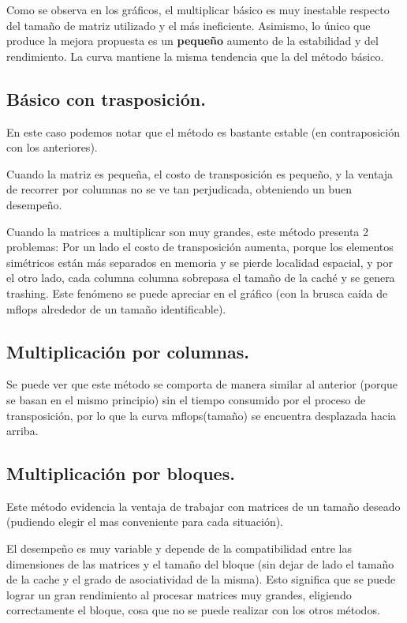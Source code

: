 \documentclass[a4paper,10pt]{article}
\begin{document}
Como se observa en los gráficos, el multiplicar básico es muy inestable respecto del tamaño de matriz utilizado y el más ineficiente. Asimismo, lo único que produce la mejora propuesta es un \textbf{pequeño} aumento de la estabilidad y del rendimiento. La curva mantiene la misma tendencia que la del método básico.

\subsection{Básico con trasposición.}

En este caso podemos notar que el método es bastante estable (en contraposición con los anteriores).

Cuando la matriz es pequeña, el costo de transposición es pequeño, y la ventaja de recorrer por columnas no se ve tan perjudicada, obteniendo un buen desempeño. 

Cuando la matrices a multiplicar son muy grandes, este método presenta 2 problemas: Por un lado el costo de transposición aumenta, porque los elementos simétricos están más separados en memoria y se pierde localidad espacial, y por el otro lado, cada columna columna sobrepasa el tamaño de la caché y se genera trashing. Este fenómeno se puede apreciar en el gráfico (con la brusca caída de mflops alrededor de un tamaño identificable).

\subsection{Multiplicación por columnas.}

Se puede ver que este método se comporta de manera similar al anterior (porque se basan en el mismo principio) sin el tiempo consumido por el proceso de transposición, por lo que la curva mflops(tamaño) se encuentra desplazada hacia arriba.

\subsection{Multiplicación por bloques.}

Este método evidencia la ventaja de trabajar con matrices de un tamaño deseado (pudiendo elegir el mas conveniente para cada situación).

El desempeño es muy variable y depende de la compatibilidad entre las dimensiones de las matrices y el tamaño del bloque (sin dejar de lado el tamaño de la cache y el grado de asociatividad de la misma). Esto significa que se puede lograr un gran rendimiento al procesar matrices muy grandes, eligiendo correctamente el bloque, cosa que no se puede realizar con los otros métodos. 
\end{document}
